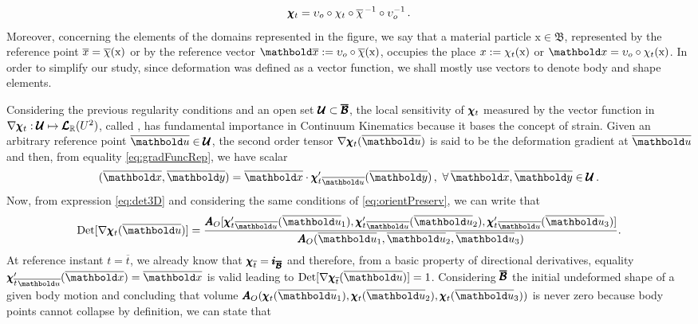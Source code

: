 \begin{equation}
\pmb{\chi}_t = \upsilon_o\circ\chi_t\circ\overline{\chi}^{\,-1}\circ\upsilon_o^{-1}\,.
\end{equation}
Moreover, concerning the elements of the domains represented in the figure, we say that a material particle $\text{x}\in\mathfrak{B}$, represented by the reference point $\overline{x}=\overline{\chi}(\text{x})$ or by the reference vector $\vto{\overline{x}}:=\fua{\upsilon_o\circ\overline{\chi}}{\text{x}}$, occupies the place $x:=\chi_t(\text{x})$ or $\vto{x}=\fua{\upsilon_o\circ\chi_t}{\text{x}}$. In order to simplify our study, since deformation was defined as a vector function, we shall mostly use vectors to denote body and shape elements.  

Considering the previous regularity conditions and an open set $\pmb{\mathcal{U}}\subset\pmb{\overline{\mathcal{B}}}$, the local sensitivity of $\pmb{\chi}_t$ measured by the vector function in $\nabla\pmb{\chi}_t : \pmb{\mathcal{U}} \mapsto \pmb{\mathcal{L}}_{\mathbb{R}}(U^{2})$, called , has fundamental importance in Continuum Kinematics because it bases the concept of strain. Given an arbitrary reference point $\overline{\vto{u}}\in\pmb{\mathcal{U}}$, the second order tensor $\fua{\nabla\tnr{\chi}_t}{\overline{\vto{u}}}$ is said to be the deformation gradient at $\overline{\vto{u}}$ and then, from equality \eqref{eq:gradFuncRep}, we have scalar
\begin{equation}
[\fua{\nabla\tnr{\chi}_t}{\overline{\vto{u}}}](\overline{\vto{x}},\overline{\vto{y}})=\overline{\vto{x}}\cdot\fua{{\tnr{\chi}'_t}_{\overline{\vto{u}}}}{\overline{\vto{y}}}\,,\,\,\forall\, \overline{\vto{x}},\overline{\vto{y}}\in\pmb{\mathcal{U}}\,.
\end{equation}
Now, from expression \eqref{eq:det3D} and considering the same conditions of \eqref{eq:orientPreserv}, we can write that 
\begin{equation}
\textnormal{Det}[\fua{\nabla\tnr{\chi}_t}{\overline{\vto{u}}}]=\dfrac{{\tnr{A}_O}[\fua{ {\tnr{\chi}'_t}_{\overline{\vto{u}}} }{ \overline{\vto{u}}_1 },\fua{ {\tnr{\chi}'_t}_{\overline{\vto{u}}} }{ \overline{\vto{u}}_2 },{\fua{ {\tnr{\chi}'_t}_{\overline{\vto{u}} }}{ \overline{\vto{u}}_3 }}]}{\fua{\tnr{A}_O}{ \overline{\vto{u}}_1 , \overline{\vto{u}}_2 , \overline{\vto{u}}_3 }}.
\end{equation}
At reference instant $t=\overline{t}$, we already know that $\pmb{\chi}_{\overline{t}}=\pmb{i}_{\pmb{\overline{\mathcal{B}}}}$ and therefore, from a basic property of directional derivatives, equality $\fua{ {\tnr{\chi}'_{\overline{t}} }_{\overline{\vto{u}}} }{ \overline{\vto{x}} }=\overline{\vto{x}}$ is valid leading to $\textnormal{Det}[\fua{\nabla\tnr{\chi}_{\overline{t}}}{\overline{\vto{u}}}]=1$. Considering $\pmb{\overline{\mathcal{B}}}$ the initial undeformed shape of a given body motion and concluding that volume $\fua{\tnr{A}_O}{\fua{\tnr{\chi}_t}{\overline{\vto{u}}_1},\fua{\tnr{\chi}_t}{\overline{\vto{u}}_2},\fua{\tnr{\chi}_t}{\overline{\vto{u}}_3}}$ is never zero because body points cannot collapse by definition, we can state that       
